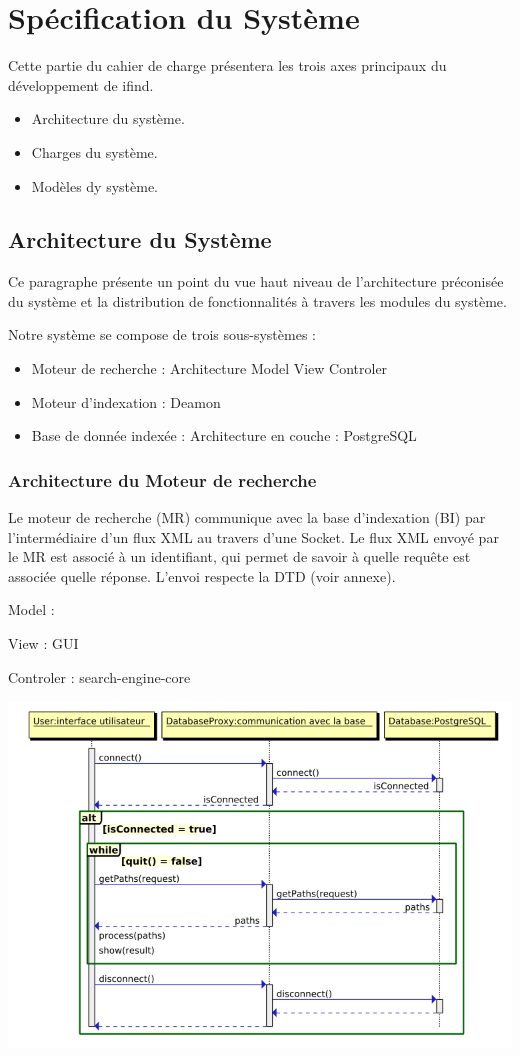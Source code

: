 \section{Spécification du Système}
Cette partie du cahier de charge présentera les trois axes principaux du développement de ifind.
\begin{itemize}
 \item Architecture du système.
 \item Charges du système.
 \item Modèles dy système.
\end{itemize}

\subsection{Architecture du Système}
Ce paragraphe présente un point du vue haut niveau de l'architecture préconisée du système et la distribution de fonctionnalités à travers 
les modules du système.

Notre système se compose de trois sous-systèmes :
\begin{itemize}
 \item Moteur de recherche : Architecture Model View Controler
 \item Moteur d'indexation : Deamon
 \item Base de donnée indexée : Architecture en couche : PostgreSQL
\end{itemize}

\subsubsection{Architecture du Moteur de recherche}
Le moteur de recherche (MR) communique avec la base d'indexation (BI) par l'intermédiaire d'un flux XML au travers d'une Socket.
Le flux XML envoyé par le MR est associé à un identifiant, qui permet de savoir à quelle requête est associée quelle réponse.
L'envoi respecte la DTD (voir annexe).


Model :

View : GUI

Controler : search-engine-core
\begin{center}
\includegraphics[scale=0.5]{seqmrbi.png}
\end{center}


